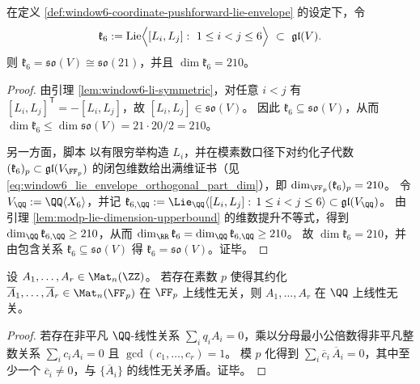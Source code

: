 \begin{theorem}\label{thm:window6-lie-envelope-so21-from-commutators}
在定义 \ref{def:window6-coordinate-pushforward-lie-envelope} 的设定下，令
\[
\mathfrak{k}_6:=\mathrm{Lie}\Bigl\langle [L_i,L_j]:\ 1\le i<j\le 6\Bigr\rangle\ \subset\ \mathfrak{gl}(V).
\]
则 \(\mathfrak{k}_6=\mathfrak{so}(V)\cong \mathfrak{so}(21)\)，并且 \(\dim\mathfrak{k}_6=210\)。
\end{theorem}
\begin{proof}
由引理 \ref{lem:window6-li-symmetric}，对任意 \(i<j\) 有
\(
[L_i,L_j]^{\mathsf T}=-[L_i,L_j]
\)，故 \([L_i,L_j]\in\mathfrak{so}(V)\)。
因此 \(\mathfrak{k}_6\subseteq\mathfrak{so}(V)\)，从而 \(\dim\mathfrak{k}_6\le \dim\mathfrak{so}(V)=21\cdot 20/2=210\)。\par
另一方面，脚本 \texttt{} 以有限穷举构造 \(L_i\)，并在模素数口径下对约化子代数 \((\mathfrak{k}_6)_p\subset \mathfrak{gl}(V_{\FF_p})\) 的闭包维数给出满维证书（见 \eqref{eq:window6_lie_envelope_orthogonal_part_dim}），即 \(\dim_{\FF_p}(\mathfrak{k}_6)_p=210\)。
令 \(V_{\QQ}:=\QQ\langle X_6\rangle\)，并记
\(
\mathfrak{k}_{6,\QQ}:=\Lie_{\QQ}\langle [L_i,L_j]:\,1\le i<j\le 6\rangle\subset\mathfrak{gl}(V_{\QQ})
\)。
由引理 \ref{lem:modp-lie-dimension-upperbound} 的维数提升不等式，得到 \(\dim_{\QQ}\mathfrak{k}_{6,\QQ}\ge 210\)，从而 \(\dim_{\RR}\mathfrak{k}_{6}=\dim_{\QQ}\mathfrak{k}_{6,\QQ}\ge 210\)。
故 \(\dim\mathfrak{k}_6=210\)，并由包含关系 \(\mathfrak{k}_6\subseteq\mathfrak{so}(V)\) 得 \(\mathfrak{k}_6=\mathfrak{so}(V)\)。证毕。
\end{proof}

\begin{lemma}[模素数线性独立性证书的提升]\label{lem:modp-independence-lift}
设 \(A_1,\dots,A_r\in \Mat_n(\ZZ)\)。
若存在素数 \(p\) 使得其约化 \(\overline{A}_1,\dots,\overline{A}_r\in \Mat_n(\FF_p)\) 在 \(\FF_p\) 上线性无关，则 \(A_1,\dots,A_r\) 在 \(\QQ\) 上线性无关。
\end{lemma}
\begin{proof}
若存在非平凡 \(\QQ\)-线性关系 \(\sum_i q_iA_i=0\)，乘以分母最小公倍数得非平凡整数关系 \(\sum_i c_iA_i=0\) 且 \(\gcd(c_1,\dots,c_r)=1\)。
模 \(p\) 化得到 \(\sum_i \overline{c}_i\,\overline{A}_i=0\)，其中至少一个 \(\overline{c}_i\neq 0\)，与 \(\{\overline{A}_i\}\) 的线性无关矛盾。证毕。
\end{proof}

